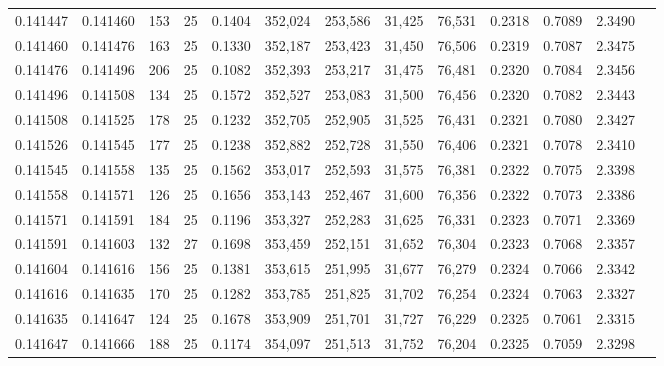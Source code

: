 \begin{tabular}{rrrrrrrrrrrrr}
0.141447 & 0.141460 &   153 &  25 &                                     0.1404 & 352,024 & 253,586 &  31,425 &  76,531 & 0.2318 & 0.7089 & 2.3490 \\
0.141460 & 0.141476 &   163 &  25 &                                     0.1330 & 352,187 & 253,423 &  31,450 &  76,506 & 0.2319 & 0.7087 & 2.3475 \\
0.141476 & 0.141496 &   206 &  25 &                                     0.1082 & 352,393 & 253,217 &  31,475 &  76,481 & 0.2320 & 0.7084 & 2.3456 \\
0.141496 & 0.141508 &   134 &  25 &                                     0.1572 & 352,527 & 253,083 &  31,500 &  76,456 & 0.2320 & 0.7082 & 2.3443 \\
0.141508 & 0.141525 &   178 &  25 &                                     0.1232 & 352,705 & 252,905 &  31,525 &  76,431 & 0.2321 & 0.7080 & 2.3427 \\
0.141526 & 0.141545 &   177 &  25 &                                     0.1238 & 352,882 & 252,728 &  31,550 &  76,406 & 0.2321 & 0.7078 & 2.3410 \\
0.141545 & 0.141558 &   135 &  25 &                                     0.1562 & 353,017 & 252,593 &  31,575 &  76,381 & 0.2322 & 0.7075 & 2.3398 \\
0.141558 & 0.141571 &   126 &  25 &                                     0.1656 & 353,143 & 252,467 &  31,600 &  76,356 & 0.2322 & 0.7073 & 2.3386 \\
0.141571 & 0.141591 &   184 &  25 &                                     0.1196 & 353,327 & 252,283 &  31,625 &  76,331 & 0.2323 & 0.7071 & 2.3369 \\
0.141591 & 0.141603 &   132 &  27 &                                     0.1698 & 353,459 & 252,151 &  31,652 &  76,304 & 0.2323 & 0.7068 & 2.3357 \\
0.141604 & 0.141616 &   156 &  25 &                                     0.1381 & 353,615 & 251,995 &  31,677 &  76,279 & 0.2324 & 0.7066 & 2.3342 \\
0.141616 & 0.141635 &   170 &  25 &                                     0.1282 & 353,785 & 251,825 &  31,702 &  76,254 & 0.2324 & 0.7063 & 2.3327 \\
0.141635 & 0.141647 &   124 &  25 &                                     0.1678 & 353,909 & 251,701 &  31,727 &  76,229 & 0.2325 & 0.7061 & 2.3315 \\
0.141647 & 0.141666 &   188 &  25 &                                     0.1174 & 354,097 & 251,513 &  31,752 &  76,204 & 0.2325 & 0.7059 & 2.3298 \\

\end{tabular}
